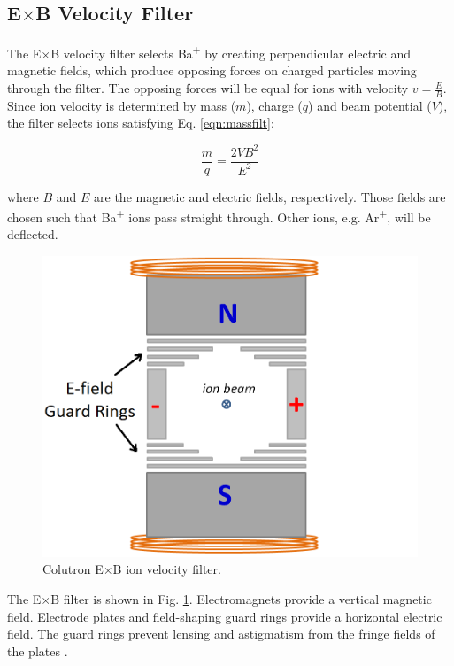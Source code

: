 
\subsection{E$\times$B Velocity Filter}

The E$\times$B velocity filter selects Ba\textsuperscript{+} by creating perpendicular electric and magnetic fields, which produce opposing forces on charged particles moving through the filter.  The opposing forces will be equal for ions with velocity $v = \frac{E}{B}$.  Since ion velocity is determined by mass ($m$), charge ($q$) and beam potential ($V$), the filter selects ions satisfying Eq. \ref{eqn:massfilt}:

\begin{equation}
\frac{m}{q} = \frac{2 V B^{2}}{E^{2}}
\label{eqn:massfilt}
\end{equation}

\noindent
where $B$ and $E$ are the magnetic and electric fields, respectively.  Those fields are chosen such that Ba\textsuperscript{+} ions pass straight through.  Other ions, e.g. Ar\textsuperscript{+}, will be deflected.  

\begin{figure} %
        \centering
                \includegraphics[width=.6\textwidth]{figures/ExB.png}
                \caption{Colutron E$\times$B ion velocity filter.}
\label{fig:exb}
\end{figure}


The E$\times$B filter is shown in Fig. \ref{fig:exb}.  Electromagnets provide a vertical magnetic field.  Electrode plates and field-shaping guard rings provide a horizontal electric field.  The guard rings prevent lensing and astigmatism from the fringe fields of the plates \cite{Colutron}.

